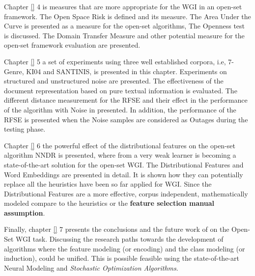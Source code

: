 Chapter \ref{} 4 is measures that are more appropriate for the WGI in an open-set framework. The Open Space Risk is defined and its measure. The Area Under the Curve is presented as a measure for the open-set algorithms, The Openness test is discussed. The Domain Transfer Measure and other potential measure for the open-set framework evaluation are presented. 

Chapter \ref{} 5 a set of experiments using three well established corpora, i.e, 7-Genre, KI04 and SANTINIS, is presented in this chapter. Experiments on structured and unstructured noise are presented. The effectiveness of the document representation based on pure textual information is evaluated. The different distance measurement for the RFSE and their effect in the performance of the algorithm with Noise in presented. In addition, the performance of the RFSE  is presented when the Noise samples are considered as Outages during the testing phase.

Chapter \ref{} 6 the powerful effect of the distributional features on the open-set algorithm NNDR is presented, where from a very weak learner is becoming a state-of-the-art solution for the open-set WGI. The Distributional Features and Word Embeddings are presented in detail. It is shown how they can potentially replace all the heuristics have been so far applied for WGI. Since the Distributional Features are a more effective, corpus independent, mathematically modeled compare to the heuristics or the \textbf{feature selection manual assumption}. 

Finally, chapter \ref{} 7 presents the conclusions and the future work of on the Open-Set WGI task. Discussing the research paths towards the development of algorithms where the feature modeling (or encoding) and the class modeling (or induction), could be unified. This is possible feasible using the state-of-the-art Neural Modeling and \textit{Stochastic Optimization Algorithms}.

